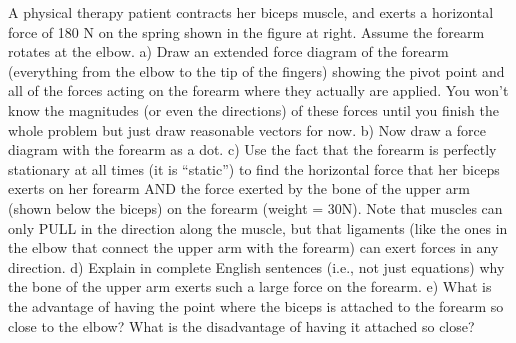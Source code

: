 \label{fnt7.3.2-1}

A physical therapy patient contracts her biceps muscle, and exerts a horizontal force of 180 N on the spring shown in the figure at right.  Assume the forearm rotates at the elbow.
a)	Draw an extended force diagram of the forearm (everything from the elbow to the tip of the fingers) showing the pivot point and all of the forces acting on the forearm where they actually are applied.   You won't know the magnitudes (or even the directions) of these forces until you finish the whole problem but just draw reasonable vectors for now.   
b)	Now draw a force diagram with the forearm as a dot.
c)	Use the fact that the forearm is perfectly stationary at all times (it is ``static'') to find the horizontal force that her biceps exerts on her forearm AND the force exerted by the bone of the upper arm (shown below the biceps) on the forearm (weight = 30N).   Note that muscles can only PULL in the direction along the muscle, but that ligaments (like the ones in the elbow that connect the upper arm with the forearm) can exert forces in any direction.
d)	Explain in complete English sentences (i.e., not just equations) why the bone of the upper arm exerts such a large force on the forearm.
e)	What is the advantage of having the point where the biceps is attached to the forearm so close to the elbow?  What is the disadvantage of having it attached so close?